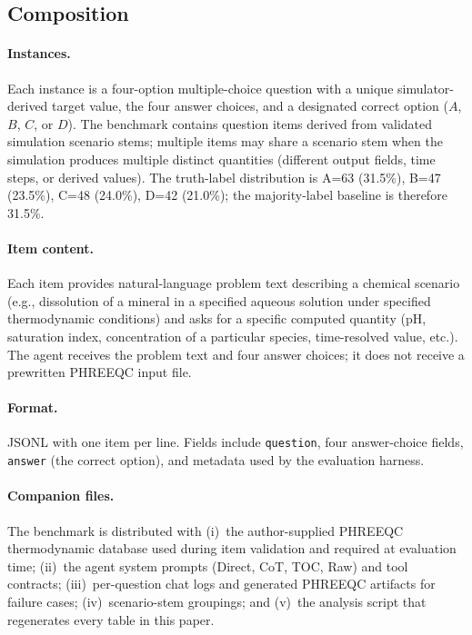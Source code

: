 \documentclass{article}
\begin{document}
\subsection{Composition}

\paragraph{Instances.}
Each instance is a four-option multiple-choice question with a unique simulator-derived target value, the four answer choices, and a designated correct option ($A$, $B$, $C$, or $D$). The benchmark contains \BenchN{} question items derived from \BenchScenarioN{} validated simulation scenario stems; multiple items may share a scenario stem when the simulation produces multiple distinct quantities (different output fields, time steps, or derived values). The truth-label distribution is A=63 (31.5\%), B=47 (23.5\%), C=48 (24.0\%), D=42 (21.0\%); the majority-label baseline is therefore 31.5\%.

\paragraph{Item content.}
Each item provides natural-language problem text describing a chemical scenario (e.g., dissolution of a mineral in a specified aqueous solution under specified thermodynamic conditions) and asks for a specific computed quantity (pH, saturation index, concentration of a particular species, time-resolved value, etc.). The agent receives the problem text and four answer choices; it does not receive a prewritten PHREEQC input file.

\paragraph{Format.}
JSONL with one item per line. Fields include \texttt{question}, four answer-choice fields, \texttt{answer} (the correct option), and metadata used by the evaluation harness.

\paragraph{Companion files.}
The benchmark is distributed with (i)~the author-supplied PHREEQC thermodynamic database used during item validation and required at evaluation time; (ii)~the agent system prompts (Direct, CoT, TOC, Raw) and tool contracts; (iii)~per-question chat logs and generated PHREEQC artifacts for failure cases; (iv)~scenario-stem groupings; and (v)~the analysis script that regenerates every table in this paper.
\end{document}
